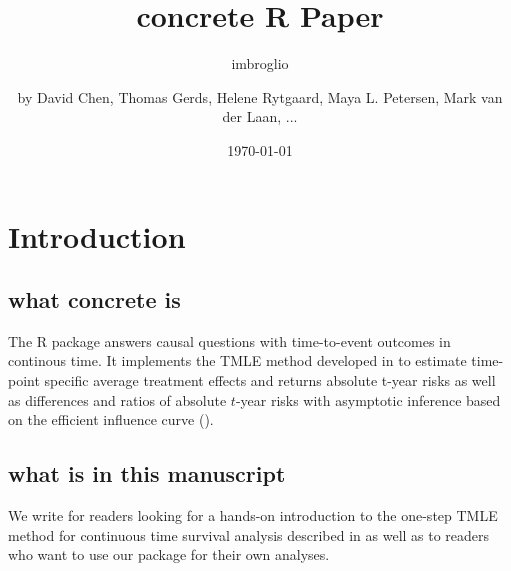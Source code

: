 \documentclass{report}
\author{imbroglio}
\date{\today}
\title{}
\newcommand{\1}{\ensuremath{\mathbf{1}}}
\begin{document}
\title{concrete R Paper}
\subtitle{}
\author{by David Chen, Thomas Gerds, Helene Rytgaard, Maya L. Petersen, Mark van der Laan, ...}

\maketitle


\section{Introduction}
\label{intro}
\subsection{what concrete is}
\label{sec:org4b171e8}

The R package  answers causal questions with time-to-event outcomes in continous time. It implements the TMLE method developed in \cite{rytgaard_one-step_2021} to estimate time-point specific average treatment effects and returns absolute t-year risks as well as differences and ratios of absolute \(t\)-year risks with asymptotic inference based on the efficient influence curve (\cite{laan_unified_2003-1}).

\subsection{what is in this manuscript}
\label{sec:orgf1d15dc}

We write for readers looking for a hands-on introduction to the one-step TMLE method for
continuous time survival analysis described in \cite{rytgaard_one-step_2021} as well as to readers
who want to use our package for their own analyses.
\end{document}
